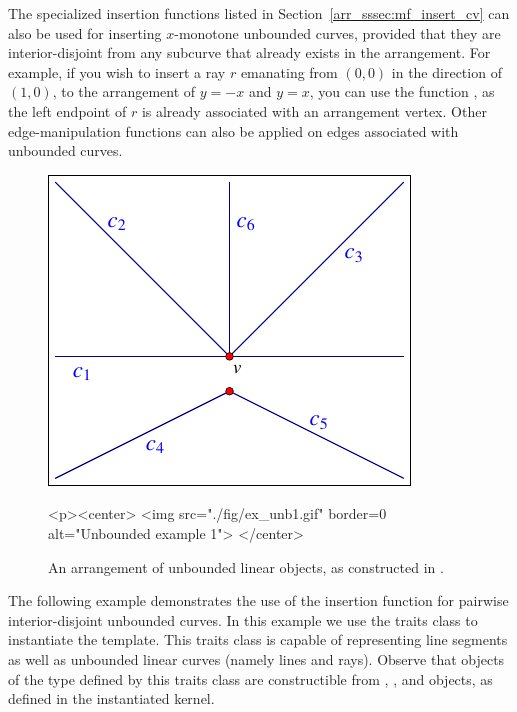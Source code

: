 The specialized insertion functions listed in
Section~\ref{arr_sssec:mf_insert_cv} can also be used for inserting
$x$-monotone unbounded curves, provided that they are interior-disjoint
from any subcurve that already exists in the arrangement. For example,
if you wish to insert a ray $r$ emanating from $(0,0)$ in the direction
of $(1,0)$, to the arrangement of $y = -x$ and $y = x$, you can use
the function , as the left
endpoint of $r$ is already associated with an arrangement vertex.
Other edge-manipulation functions can also be applied on edges
associated with unbounded curves.

\begin{figure}[t]
\begin{ccTexOnly}
  \begin{center}
  \includegraphics{Arrangement_on_surface_2/fig/ex_unb1}
  \end{center}
\end{ccTexOnly}
\begin{ccHtmlOnly}
  <p><center>
  <img src="./fig/ex_unb1.gif" border=0 alt="Unbounded example 1">
  </center>
\end{ccHtmlOnly}
\caption{An arrangement of unbounded linear objects, as constructed
in .\label{arr_fig:ex_unb1}}
\end{figure}

The following example demonstrates the use of the insertion function
for pairwise interior-disjoint unbounded curves. In this example
we use the traits class  to
instantiate the  template. This traits class is
capable of representing line segments as well as unbounded linear
curves (namely lines and rays). Observe that objects of the type
 defined by this traits class are
constructible from , , and 
objects, as defined in the instantiated kernel.

